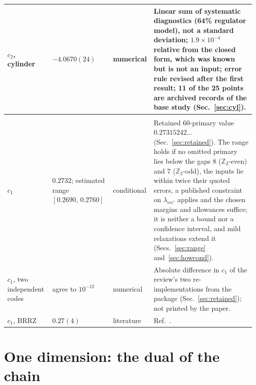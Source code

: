\documentclass[11pt,a4paper]{article}
\numberwithin{equation}{section}
\newcommand{\sci}[2]{#1\times10^{#2}}
\begin{document}
{\begin{longtable}{@{}>{\raggedright\arraybackslash}p{}>{\raggedright\arraybackslash}p{}>{\raggedright\arraybackslash}p{}>{\raggedright\arraybackslash}p{}@{}}
$c_2$, cylinder & $-4.0670(24)$ & numerical & Linear sum of systematic diagnostics (64\% regulator model), not a standard deviation; $\sci{1.9}{-4}$ relative from the closed form, which was known but is not an input; error rule revised after the first result; 11 of the 25 points are archived records of the base study (Sec.~\ref{sec:cyl}).\\
\midrule
\multicolumn{4}{@{}l}{$d=3$}\\
$c_1$ & $0.2732$; estimated range $[0.2690,\,0.2760]$ & conditional & Retained 60-primary value $0.27315242\ldots$ (Sec.~\ref{sec:retained}). The range holds if no omitted primary lies below the gaps 8 ($\mathbb Z_2$-even) and 7 ($\mathbb Z_2$-odd), the inputs lie within twice their quoted errors, a published constraint on $\lambda_{\epsilon\epsilon\epsilon'}$ applies and the chosen margins and allowances suffice; it is neither a bound nor a confidence interval, and mild relaxations extend it (Secs.~\ref{sec:range} and~\ref{sec:howcond}).\\
$c_1$, two independent codes & agree to $10^{-12}$ & numerical & Absolute difference in $c_1$ of the review's two re-implementations from the package (Sec.~\ref{sec:retained}); not printed by the paper.\\
$c_1$, BRRZ & $0.27(4)$ & literature & Ref.~\cite{Behan:2017emf}.\\
\end{longtable}
}

\section{One dimension: the dual of the chain}\label{sec:d1}
\end{document}
